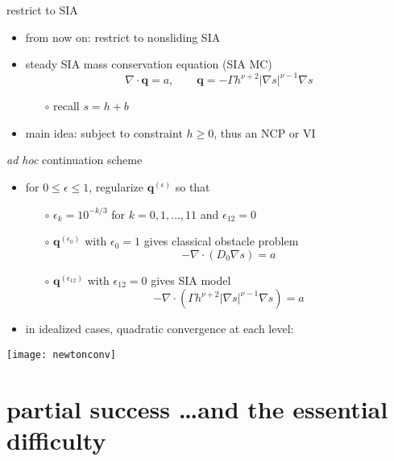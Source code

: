 \documentclass[xcolor={dvipsnames}]{beamer}
\newcommand\bq{\mathbf{q}}
\newcommand\Div{\nabla\cdot}
\newcommand\eps{\epsilon}
\newcommand\grad{\nabla}
\begin{document}
\begin{frame}{restrict to SIA}

\begin{itemize}
\item from now on: restrict to nonsliding SIA
\item steady SIA mass conservation equation (SIA MC)
    $$\Div \bq = a, \qquad \bq = - \Gamma h^{\nu+2} |\grad s|^{\nu-1} \grad s$$

\vspace{-2mm}
    \begin{itemize}
    \item[$\circ$] recall $s=h+b$
    \end{itemize}
\item main idea: \alert{subject to constraint $h\ge 0$, thus an NCP or VI}
\end{itemize}
\end{frame}


\begin{frame}{\emph{ad hoc} continuation scheme}

\begin{itemize}
\item for $0 \le \eps \le 1$, regularize $\bq^{(\eps)}$ so that
  \begin{itemize}
  \item[$\circ$] $\eps_k = 10^{-k/3}$ for $k=0,1,\dots,11$ and $\eps_{12}=0$
  \item[$\circ$] $\bq^{(\eps_0)}$ with $\eps_0=1$ gives classical obstacle problem
    $$- \Div (D_0 \grad s) = a$$
  \item[$\circ$] $\bq^{(\eps_{12})}$ with $\eps_{12}=0$ gives SIA model
    $$- \Div (\Gamma h^{\nu+2} |\grad s|^{\nu-1} \grad s) = a$$
  \end{itemize}
\item in idealized cases, quadratic convergence at each level:
\end{itemize}

\begin{center}
\texttt{[image: newtonconv]}
\end{center}
\end{frame}


\section{partial success \dots and the essential difficulty}
\end{document}
